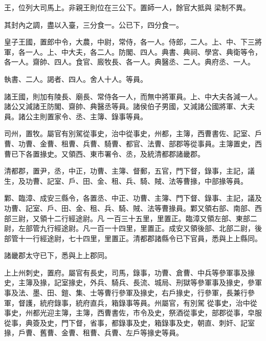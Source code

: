 \begin{pinyinscope}
 王，位列大司馬上。非親王則位在三公下。置師一人，餘官大抵與
 梁制不異。



 其封內之調，盡以入臺，三分食一。公已下，四分食一。



 皇子王國，置郎中令，大農，中尉，常侍，各一人。侍郎，二人。上、中、下三將軍，各一人。上、中大夫，各二人。防閣、四人。典書、典祠、學宮、典衛等令，各一人。齋帥、四人。食官、廄牧長、各一人。典醫丞、二人。典府丞、一人。



 執書、二人。謁者、四人。舍人十人。等員。



 諸王國，則加有陵長、廟長、常侍各一人，而無中將軍員。上、中大夫各減一人。諸公又減諸王防閣、齋帥、典醫丞等員。諸侯伯子男國，又減諸公國將軍、大夫員。諸公主則置家令、丞、主簿、錄事等員。



 司州，置牧。屬官有別駕從事史，治中從事史，州都，主簿，西曹書佐、記室、戶曹、功曹、金曹、租曹、兵曹、騎曹、都官、法曹、部郡等從事員。主簿置史，西曹已下各置掾史。又領西、東市署令、丞，及統清都郡諸畿郡。



 清都郡，置尹，丞，中正，功曹、主簿、督郵，五官，門下督，錄事，主記，議生，及功曹、記室、戶、田、金、租、兵、騎、賊、法等曹掾，中部掾等員。



 鄴、臨漳、成安三縣令，各置丞、中正、功曹、主簿、門下督、錄事、主記，議及功曹、記室、戶、田、金、租、兵、騎、賊、法等曹掾員。鄴又領右部、南部、西部三尉，又領十二行經途尉。凡
 一百三十五里，里置正。臨漳又領左部、東部二尉，左部管九行經途尉。凡一百一十四里，里置正。成安又領後部、北部二尉，後部管十一行經途尉，七十四里，里置正。清都郡諸縣令已下官員，悉與上上縣同。



 諸畿郡太守已下，悉與上上郡同。



 上上州刺史，置府。屬官有長史，司馬，錄事，功曹、倉曹、中兵等參軍事及掾史，主簿及掾，記室掾史，外兵、騎兵、長流、城局、刑獄等參軍事及掾史，參軍事及法、墨、田、鎧、集、士等曹行參軍及掾史，右戶掾史，行參軍，長兼行參軍，督護，統府錄事，統府直兵，箱錄事等員。州屬官，有別駕
 從事史，治中從事史，州都光迎主簿，主簿，西曹書佐，市令及史，祭酒從事史，部郡從事，皁服從事，典簽及史，門下督，省事，都錄事及史，箱錄事及史，朝直、刺奸、記室掾，戶曹、舊曹、金曹、租曹、兵曹、左戶等掾史等員。




\end{pinyinscope}
